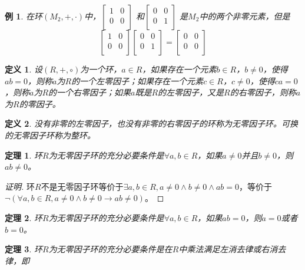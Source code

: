 \documentclass{article}
\newtheorem{Def}{定义}
\newtheorem{Thm}{定理}
\newtheorem*{Example}{例}
\begin{document}
\begin{CJK*}{UTF8}{gbsn}
  \begin{Example}
    在环$(M_2,+,\cdot)$中，$\begin{bmatrix}
      1&0\\
      0&0\\
    \end{bmatrix}$
    和$\begin{bmatrix}
      0&0\\
      0&1\\
    \end{bmatrix}$
    是$M_2$中的两个非零元素，但是\[\begin{bmatrix}
      1&0\\
      0&0\\
    \end{bmatrix}\begin{bmatrix}
      0&0\\
      0&1\\
    \end{bmatrix}=\begin{bmatrix}
      0&0\\
      0&0\\
    \end{bmatrix}\]
  \end{Example}
  
  \begin{Def}
    设$(R,+,\circ)$为一个环，$a\in R$，如果存在一个元素$b\in R$，$b\neq 0$，使得$ab=0$，则称$a$为$R$的一个左零因子；如果存在一个元素$c\in R$，$c\neq 0$，使得$ca=0$，则称$a$为$R$的一个右零因子；如果$a$既是$R$的左零因子，又是$R$的右零因子，则称$a$为$R$的零因子。
  \end{Def}
  
  \begin{Def}
    没有非零的左零因子，也没有非零的右零因子的环称为无零因子环。可换的无零因子环称为整环。
  \end{Def}
  
  \begin{Thm}
    环$R$为无零因子环的充分必要条件是$\forall a,b \in R$，如果$a\neq 0$并且$b\neq 0$，则$ab\neq 0$。
  \end{Thm}
  \begin{proof}[证明]
    环$R$不是无零因子环等价于$\exists a,b\in R, a\neq 0\land b\neq 0\land ab=0$，等价于$\lnot (\forall a,b\in R,a\neq 0\land b\neq 0 \to ab\neq 0)$。
  \end{proof}
  \begin{Thm}
    环$R$为无零因子环的充分必要条件是$\forall a,b\in R$，如果$ab=0$，则$a=0$或者$b=0$。
  \end{Thm}
  \begin{Thm}
    环$R$为无零因子环的充分必要条件是在$R$中乘法满足左消去律或右消去律，即
  

\end{Thm}
\end{CJK*}
\end{document}
